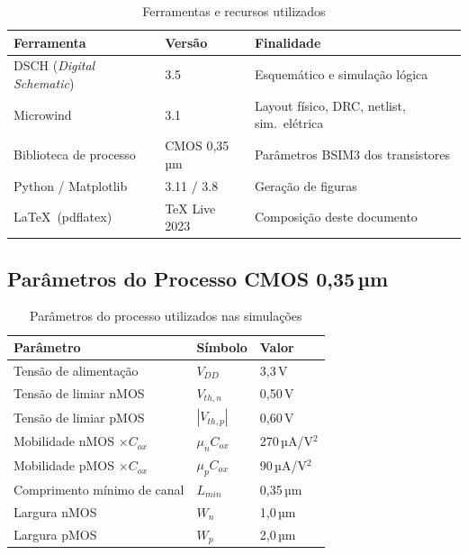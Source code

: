 \documentclass[12pt,a4paper]{article}
\begin{document}
\begin{table}[H]
  \centering
  \caption{Ferramentas e recursos utilizados}
  \label{tab:ferramentas}
  \begin{tabular}{lll}
    \toprule
    \textbf{Ferramenta} & \textbf{Versão} & \textbf{Finalidade} \\
    \midrule
    DSCH (\textit{Digital Schematic}) & 3.5           & Esquemático e simulação lógica \\
    Microwind                         & 3.1           & Layout físico, DRC, netlist, sim.\ elétrica \\
    Biblioteca de processo            & CMOS 0,35\,µm & Parâmetros BSIM3 dos transistores \\
    Python / Matplotlib               & 3.11 / 3.8    & Geração de figuras \\
    \LaTeX\ (pdflatex)                & TeX Live 2023 & Composição deste documento \\
    \bottomrule
  \end{tabular}
\end{table}

\subsection{Parâmetros do Processo CMOS 0,35\,µm}

\begin{table}[H]
  \centering
  \caption{Parâmetros do processo utilizados nas simulações}
  \label{tab:processo}
  \begin{tabular}{lll}
    \toprule
    \textbf{Parâmetro} & \textbf{Símbolo} & \textbf{Valor} \\
    \midrule
    Tensão de alimentação       & $V_{DD}$             & 3,3\,V \\
    Tensão de limiar nMOS       & $V_{th,n}$           & 0,50\,V \\
    Tensão de limiar pMOS       & $|V_{th,p}|$         & 0,60\,V \\
    Mobilidade nMOS $\times C_{ox}$ & $\mu_n C_{ox}$   & 270\,µA/V$^2$ \\
    Mobilidade pMOS $\times C_{ox}$ & $\mu_p C_{ox}$   & 90\,µA/V$^2$ \\
    Comprimento mínimo de canal & $L_{min}$            & 0,35\,µm \\
    Largura nMOS                & $W_n$                & 1,0\,µm \\
    Largura pMOS                & $W_p$                & 2,0\,µm \\
    \bottomrule
  \end{tabular}
\end{table}
\end{document}
